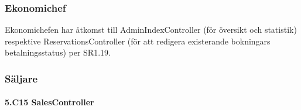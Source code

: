\documentclass[a4paper, twoside, 11pt, titlepage]{article}
\begin{document}
		\subsubsection{Ekonomichef}


		Ekonomichefen har åtkomst till AdminIndexController (för översikt och statistik) respektive ReservationsController (för att redigera existerande bokningars betalningsstatus) per SR1.19.

		\clearpage %
		\subsubsection{Säljare}



			\paragraph{5.C15 SalesController}\
\end{document}
